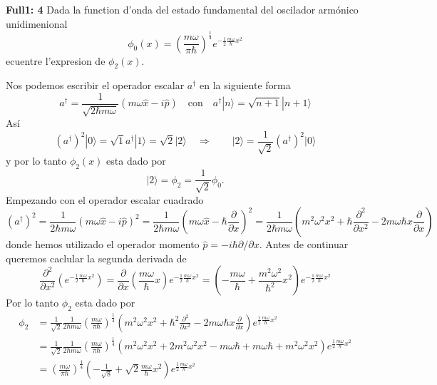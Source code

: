 \begin{ejercicio}
\textbf{Full1: 4}
Dada la function d'onda del estado fundamental del oscilador armónico
unidimenional
\begin{equation*}
	\phi_0 (x) = \left(\frac{m\omega}{\pi \hbar}\right)^{\frac{1}{4}} e^{-\frac{1}{2}
\frac{m\omega}{\hbar} x^2}
\end{equation*}
ecuentre l'expresion de $\phi_2(x)$. 
\end{ejercicio}
\begin{solucion}
Nos podemos escribir el operador escalar $a^\dagger$ en la siguiente forma
\begin{equation*}
	a^\dagger = \frac{1}{\sqrt{2\hbar m\omega}}(m \omega \hat x - i \hat p) \quad
\text{con} \quad a^\dagger | n \rangle = \sqrt{n+1} | n+1 \rangle
\end{equation*}
Así
\begin{equation*}
	(a^\dagger )^2 | 0 \rangle = \sqrt{1} a^\dagger | 1 \rangle = \sqrt{2} | 2
\rangle \quad \Rightarrow \qquad | 2\rangle = \frac{1}{\sqrt{2}}(a^\dagger)^2 | 0 \rangle
\end{equation*}
y por lo tanto $\phi_2 (x)$ esta dado por
\begin{equation*}
	|2\rangle = \phi_2 = \frac{1}{\sqrt{2}} \phi_0.
\end{equation*}
Empezando con el operador escalar cuadrado
\begin{equation*}
	(a^\dagger )^2 = \frac{1}{2\hbar m \omega} (m \omega \hat x - i \hat p)^2 =
\frac{1}{2\hbar m \omega} \left(m \omega \hat x - \hbar \frac{\partial}{\partial
x}\right)^2 = \frac{1}{2\hbar m \omega} \left(m^2 \omega^2 x^2 + \hbar
\frac{\partial^2}{\partial x^2} - 2 m \omega \hbar x \frac{\partial}{\partial
x}\right)
\end{equation*}
donde hemos utilizado el operador momento $\hat p = - i \hbar \partial/\partial
x$. Antes de continuar queremos caclular la segunda derivada de 
\begin{equation*}
	\frac{\partial^2}{\partial x^2} \left(e^{-\frac{1}{2} \frac{m\omega}{\hbar}
x^2}\right) = \frac{\partial}{\partial x} \left(\frac{m \omega}{\hbar} x \right)
e^{-\frac{1}{2} \frac{m\omega}{\hbar} x^2} = \left(-\frac{m\omega}{\hbar} +
\frac{m^2\omega^2}{\hbar^2}x^2\right) e^{-\frac{1}{2}\frac{m\omega}{\hbar} x^2}
\end{equation*}
Por lo tanto $\phi_2$ esta dado por
\begin{align*}
	\phi_2 &= \frac{1}{\sqrt{2}} \frac{1}{2 \hbar m \omega}
\left(\frac{m\omega}{\pi\hbar}\right)^{\frac{1}{4}} \left(m^2 \omega^2 x^2 +
\hbar^2 \frac{\partial^2}{\partial x^2} - 2m\omega\hbar x
\frac{\partial}{\partial x} \right) e^{\frac{1}{2} \frac{m\omega}{\hbar}x^2} \\
	&= \frac{1}{\sqrt{2}} \frac{1}{2\hbar m\omega}
\left(\frac{m\omega}{\pi\hbar}\right)^{\frac{1}{4}} \left(m^2 \omega^2 x^2 + 2
m^2 \omega^2 x^2 - m \omega \hbar + m \omega \hbar + m^2 \omega^2 x^2 \right)
e^{\frac{1}{2} \frac{m \omega}{\hbar} x^2} \\
	&= \left(\frac{m\omega}{\pi\hbar}\right)^{\frac{1}{4}}
\left(-\frac{1}{\sqrt{8}} + \sqrt{2} \frac{m\omega}{\hbar} x^2 \right)
e^{\frac{1}{2} \frac{m\omega}{\hbar} x^2}
\end{align*}
\end{solucion}
